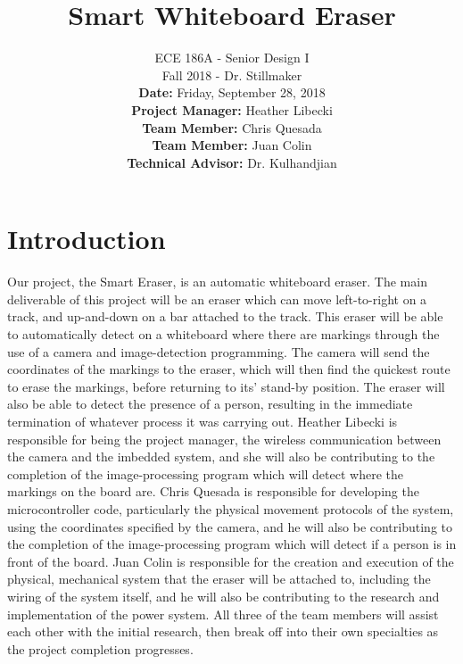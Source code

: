 \documentclass{IEEEtran}					%
\title{\vspace{2in}Smart Whiteboard Eraser}	%
\author{ECE 186A - Senior Design I \\ 			%
	Fall 2018 - Dr. Stillmaker \\ 				%
	\vspace{12pt} 								%
	\textbf{Date:} Friday, September 28, 2018  \\ 
	\vspace{2in}								%
	\vspace{6pt}
	\textbf{Project Manager:} Heather Libecki			%
	\vspace{12pt}
	\underline{\hspace{3in}}\par					%
	\textbf{Team Member:} Chris Quesada
	\vspace{12pt}
	\underline{\hspace{3in}}\par
	\textbf{Team Member:} Juan Colin
	\vspace{12pt}
	\underline{\hspace{3in}}\par
	\textbf{Technical Advisor:} Dr. Kulhandjian
	\underline{\hspace{3in}} \\
	\vspace{12in}}								%
\begin{document}
	\thispagestyle{empty}						%
	
	\maketitle									%
	
	
	\section{Introduction}
	Our project, the Smart Eraser, is an automatic whiteboard eraser. The main deliverable of this project will be an eraser which can move left-to-right on a track, and up-and-down on a bar attached to the track. This eraser will be able to automatically detect on a whiteboard where there are markings through the use of a camera and image-detection programming. The camera will send the coordinates of the markings to the eraser, which will then find the quickest route to erase the markings, before returning to its’ stand-by position. The eraser will also be able to detect the presence of a person, resulting in the immediate termination of whatever process it was carrying out.
	Heather Libecki is responsible for being the project manager, the wireless communication between the camera and the imbedded system, and she will also be contributing to the completion of the image-processing program which will detect where the markings on the board are. Chris Quesada is responsible for developing the microcontroller code, particularly the physical movement protocols of the system, using the coordinates specified by the camera, and he will also be contributing to the completion of the image-processing program which will detect if a person is in front of the board. Juan Colin is responsible for the creation and execution of the physical, mechanical system that the eraser will be attached to, including the wiring of the system itself, and he will also be contributing to the research and implementation of the power system. All three of the team members will assist each other with the initial research, then break off into their own specialties as the project completion progresses.
	
\end{document}
